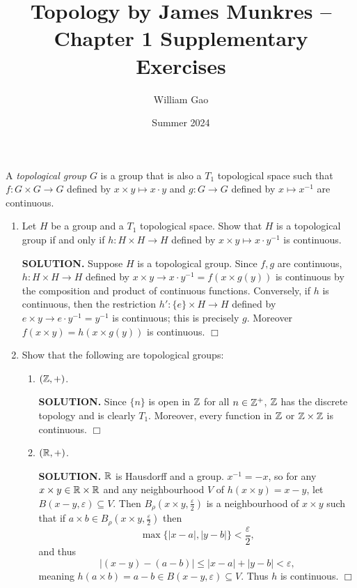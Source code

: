 \documentclass{article}
\title{Topology by James Munkres -- Chapter 1 Supplementary Exercises}
\author{William Gao}
\date{Summer 2024}
\begin{document}
\maketitle

A {\it topological group} $G$ is a group that is also a $T_1$ topological space such that $f: G \times G \rightarrow G$ defined by $x \times y \mapsto x \cdot y$ and $g: G \rightarrow G$ defined by $x \mapsto x^{-1}$ are continuous.

\begin{enumerate}
    \item Let $H$ be a group and a $T_1$ topological space. Show that $H$ is a topological group if and only if $h: H \times H \rightarrow H$ defined by $x \times y \mapsto x \cdot y^{-1}$ is continuous.
    
    {\bf SOLUTION.} Suppose $H$ is a topological group. Since $f, g$ are continuous, $h: H \times H \rightarrow H$ defined by $x \times y \rightarrow x \cdot y^{-1} = f(x \times g(y))$ is continuous by the composition and product of continuous functions. Conversely, if $h$ is continuous, then the restriction $h': \{e\} \times H \rightarrow H$ defined by $e \times y \rightarrow e \cdot y^{-1} = y^{-1}$ is continuous; this is precisely $g$. Moreover $f(x \times y) = h(x \times g(y))$ is continuous. $\Box$

    \item Show that the following are topological groups:
    \begin{enumerate}
        \item $(\mathbb{Z}, +)$.

        {\bf SOLUTION.} Since $\{n\}$ is open in $\mathbb{Z}$ for all $n \in \mathbb{Z}^+$, $\mathbb{Z}$ has the discrete topology and is clearly $T_1$. Moreover, every function in $\mathbb{Z}$ or $\mathbb{Z} \times \mathbb{Z}$ is continuous. $\Box$
        
        \item $(\mathbb{R}, +)$.

        {\bf SOLUTION.} $\mathbb{R}$ is Hausdorff and a group. $x^{-1} = -x$, so for any $x \times y \in \mathbb{R} \times \mathbb{R}$ and any neighbourhood $V$ of $h(x \times y) = x - y$, let $B(x - y, \varepsilon) \subseteq V$. Then $B_\rho(x \times y, \frac{\varepsilon}{2})$ is a neighbourhood of $x \times y$ such that if $a \times b \in B_\rho(x \times y, \frac{\varepsilon}{2})$ then
        $$\max\{|x - a|, |y - b|\} < \frac{\varepsilon}{2},$$
        and thus
        $$|(x - y) - (a - b)| \leq |x - a| + |y - b| < \varepsilon,$$
        meaning $h(a \times b) = a - b \in B(x - y, \varepsilon) \subseteq V$. Thus $h$ is continuous. $\Box$
        

\end{enumerate}
\end{enumerate}
\end{document}
